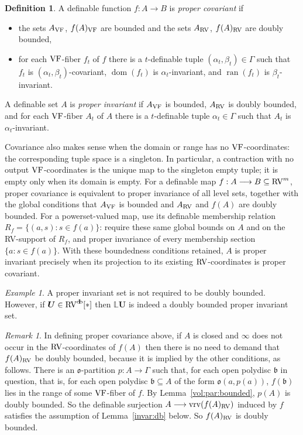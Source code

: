 \documentclass[12pt]{amsart}
\newcommand{\memph}[1]{{\color{magenta}\emph{#1}}}
\theoremstyle{plain}
\theoremstyle{definition}
\newtheorem{defn}[thm]{Definition}
\theoremstyle{remark}
\newtheorem{rem}[thm]{Remark}
\newtheorem{exam}[thm]{Example}
\numberwithin{equation}{section}
\theoremstyle{plain}
\newcommand{\VF}{\textup{VF}}
\newcommand{\RV}{\textup{RV}}
\DeclareMathOperator{\ran}{ran}
\DeclareMathOperator{\dom}{dom}
\newcommand{\gb}{\mathfrak{b}}
\newcommand{\go}{\mathfrak{o}}
\newcommand{\0}{\emptyset}
\newcommand{\bb}[1]{\mathbb{#1}}
\newcommand{\fun}{\longrightarrow}
\newcommand{\sub}{\subseteq}
\DeclareMathOperator{\vrv}{vrv}
\DeclareMathOperator{\db}{d \! b}
\begin{document}
\begin{defn}\label{prop:pseu}
A definable function $f : A \fun B$ is \memph{proper covariant} if
\begin{itemize}
  \item the sets $A_{\VF}$, $f(A)_{\VF}$ are bounded and the sets $A_{\RV}$, $f(A)_{\RV}$ are  doubly bounded,
  \item for each $\VF$-fiber $f_{t}$ of $f$ there is a $t$-definable tuple $(\alpha_t, \beta_t) \in \Gamma$ such that $f_t$ is $(\alpha_{t}, \beta_{t})$-covariant, $\dom(f_{t})$ is $\alpha_t$-invariant, and $\ran(f_{t})$ is $\beta_t$-invariant.
\end{itemize}
A definable set $A$ is \memph{proper invariant}   if $A_{\VF}$ is bounded, $A_{\RV}$ is doubly bounded, and for each $\VF$-fiber $A_t$ of $A$ there is a $t$-definable tuple $\alpha_t\in \Gamma$ such that $A_t$ is $\alpha_t$-invariant.
\end{defn}

Covariance also makes sense when the domain or range has no $\VF$-coordinates: the corresponding tuple space is a singleton. In particular, a contraction with no output $\VF$-coordinates is the unique map to the singleton empty tuple; it is empty only when its domain is empty. For a definable map $f:A\fun B\sub\RV^m$, proper covariance is equivalent to proper invariance of all level sets, together with the global conditions that $A_{\VF}$ is bounded and $A_{\RV}$ and $f(A)$ are doubly bounded. For a powerset-valued map, use its definable membership relation $R_f=\{(a,s):s\in f(a)\}$: require these same global bounds on $A$ and on the RV-support of $R_f$, and proper invariance of every membership section $\{a:s\in f(a)\}$. With these boundedness conditions retained, $A$ is proper invariant precisely when its projection to its existing $\RV$-coordinates is proper covariant.


\begin{exam}
A proper invariant set  is not required to be doubly bounded. However, if $\bm U \in \RV^{\db}[*]$ then $\bb L \bm U$ is indeed a doubly bounded proper invariant set.
\end{exam}

\begin{rem}
In defining proper covariance above, if  $A$ is closed and $\infty$ does not occur in the $\RV$-coordinates of $f(A)$ then  there is no need to demand that $f(A)_{\RV}$ be doubly bounded, because it is implied by the other conditions, as follows. There is an $\go$-partition $p: A \fun \Gamma$ such that, for each open polydisc $\gb$ in question, that is, for each open polydisc $\gb \sub A$ of the form $\go(a, p(a))$, $f(\gb)$ lies in the range of some $\VF$-fiber of $f$. By Lemma~\ref{vol:par:bounded}, $p(A)$ is doubly bounded. So the definable surjection $A \fun \vrv(f(A)_{\RV})$ induced by $f$ satisfies the assumption of Lemma~\ref{invar:db} below. So  $f(A)_{\RV}$ is doubly bounded.
\end{rem}
\end{document}

